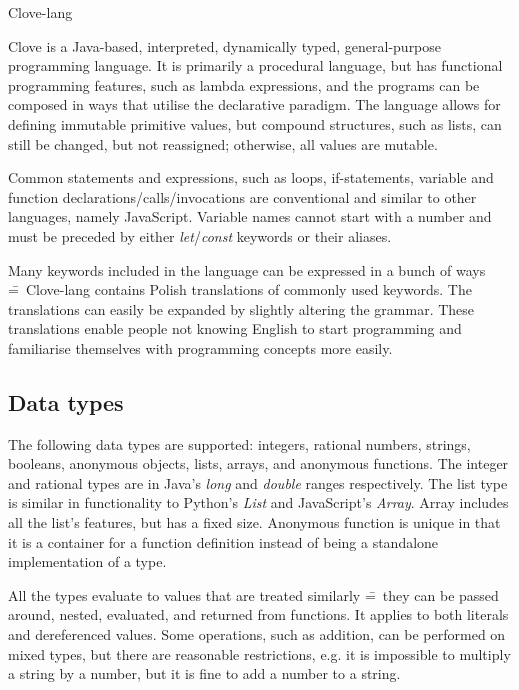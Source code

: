 \documentclass[12pt,a4paper]{article}
\begin{document}
\begin{center}
  \Huge {Clove-lang}
\end{center}

\noindent Clove is a Java-based, interpreted, dynamically typed, general-purpose programming language. It is primarily a procedural language, but has functional programming features, such as lambda expressions, and the programs can be composed in ways that utilise the declarative paradigm. The language allows for defining immutable primitive values, but compound structures, such as lists, can still be changed, but not reassigned; otherwise, all values are mutable.\par

Common statements and expressions, such as loops, if-statements, variable and function declarations/calls/invocations are conventional and similar to other languages, namely JavaScript. Variable names cannot start with a number and must be preceded by either \emph{let}/\emph{const} keywords or their aliases.\par

Many keywords included in the language can be expressed in a bunch of ways \==~Clove-lang contains Polish translations of commonly used keywords. The translations can easily be expanded by slightly altering the grammar. These translations enable people not knowing English to start programming and familiarise themselves with programming concepts more easily.



\vspace{-0.25em}
\subsection*{Data types}
The following data types are supported: integers, rational numbers, strings, booleans, anonymous objects, lists, arrays, and anonymous functions. The integer and rational types are in Java's \emph{long} and \emph{double} ranges respectively. The list type is similar in functionality to Python's \emph{List} and JavaScript's \emph{Array}. Array includes all the list's features, but has a fixed size. Anonymous function is unique in that it is a container for a function definition instead of being a standalone implementation of a type.\par

All the types evaluate to values that are treated similarly \==~they can be passed around, nested, evaluated, and returned from functions. It applies to both literals and dereferenced values. Some operations, such as addition, can be performed on mixed types, but there are reasonable restrictions, e.g. it is impossible to multiply a string by a number, but it is fine to add a number to a string.
\end{document}
